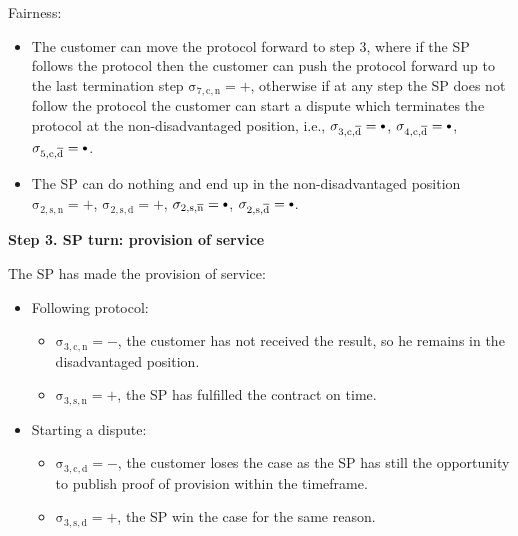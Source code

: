 \documentclass{ieeeaccess}
\newcommand\sbullet[1][.75]{\mathbin{\ThisStyle{\vcenter{\hbox{%
  \scalebox{#1}{$\SavedStyle\bullet$}}}}}%
}
\begin{document}
Fairness:

\begin{itemize}

\item
  The customer can move the protocol forward to step 3, where if the SP follows the protocol then the customer can push the protocol forward up to the last termination step \(\operatorname{\sigma_{7, c, n} = +}\), otherwise if at any step the SP does not follow the protocol the customer can start a dispute which terminates the protocol at the non-disadvantaged position, i.e., \(\operatorname{\sigma_{3, c, \overline{d}} = \sbullet}\), \(\operatorname{\sigma_{4, c, \overline{d}} = \sbullet}\), \(\operatorname{\sigma_{5, c, \overline{d}} = \sbullet}\).
\item
  The SP can do nothing and end up in the non-disadvantaged position \(\operatorname{\sigma_{2, s, n} = +}\), \(\operatorname{\sigma_{2, s, d} = +}\), \(\operatorname{\sigma_{2, s, \overline{n}} = \sbullet}\), \(\operatorname{\sigma_{2, s, \overline{d}} = \sbullet}\).
\end{itemize}

\noindent \textbf
{Step 3. SP turn: provision of service}

The SP has made the provision of service:

\begin{itemize}
\item
  Following protocol:

  \begin{itemize}
  
  \item
    \(\operatorname{\sigma_{3, c, n} = -}\), the customer has not received the result, so he remains in the disadvantaged position. 
  \item
    \(\operatorname{\sigma_{3, s, n} = +}\), the SP has fulfilled the contract on time.
  \end{itemize}
\item
  Starting a dispute:

  \begin{itemize}
  
  \item
    \(\operatorname{\sigma_{3, c, d} = -}\), the customer loses the case as the SP has still the opportunity to publish proof of provision within the timeframe. 
  \item
    \(\operatorname{\sigma_{3, s, d} = +}\), the SP win the case for the same reason.
  \end{itemize}
\end{itemize}
\end{document}
